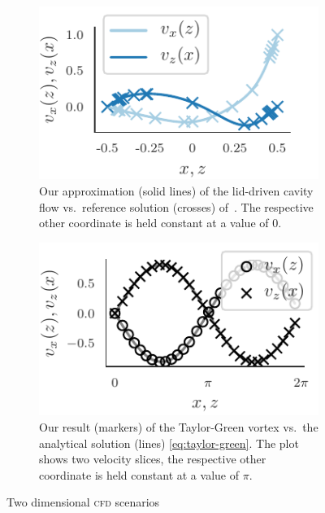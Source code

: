 \documentclass[runningheads]{llncs}
\begin{document}
\begin{figure}[tb]
  \centering
  \begin{subfigure}[t]{.473\textwidth}
    \centering
    \includegraphics{paper_lid_driven_cavity}
    \caption{\label{fig:cavity-flow}Our approximation (solid lines) of the lid-driven cavity flow vs.\ reference solution (crosses) of~\cite{ghia1982high}.
    The respective other coordinate is held constant at a value of 0.}
  \end{subfigure}\quad%
  \begin{subfigure}[t]{0.473\textwidth}
    \centering
    \includegraphics{paper_taylor_green_vel}
    \caption{\label{fig:taylor-green}Our result (markers) of the Taylor-Green vortex vs.\ the analytical solution (lines) \cref{eq:taylor-green}.
    The plot shows two velocity slices, the respective other coordinate is held constant at a value of $\pi$.}

  \end{subfigure}
  \caption{Two dimensional \textsc{cfd} scenarios}
  \label{fig:cdf-results}
\end{figure}
\end{document}
